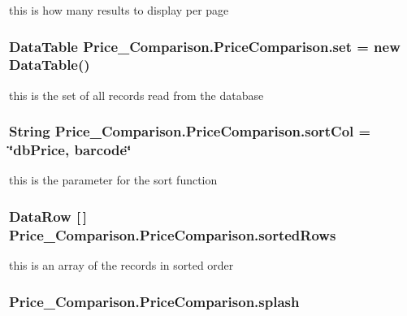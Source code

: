 this is how many results to display per page \hypertarget{class_price___comparison_1_1_price_comparison_a3d6993277a69f5816e84ceb7aa2a69c0}{
\subsubsection[{set}]{\setlength{\rightskip}{0pt plus 5cm}Data\-Table Price\-\_\-\-Comparison.\-Price\-Comparison.\-set = new Data\-Table()\hspace{0.3cm}{\ttfamily [static]}}}\label{class_price___comparison_1_1_price_comparison_a3d6993277a69f5816e84ceb7aa2a69c0}
this is the set of all records read from the database \hypertarget{class_price___comparison_1_1_price_comparison_a8b976f4f4e8b0a3d60f88ac7d799abec}{
\subsubsection[{sort\-Col}]{\setlength{\rightskip}{0pt plus 5cm}String Price\-\_\-\-Comparison.\-Price\-Comparison.\-sort\-Col = \char`\"{}db\-Price, barcode\char`\"{}\hspace{0.3cm}{\ttfamily [static]}}}\label{class_price___comparison_1_1_price_comparison_a8b976f4f4e8b0a3d60f88ac7d799abec}
this is the parameter for the sort function \hypertarget{class_price___comparison_1_1_price_comparison_adc440c55ac225fc7bcf5192a3966638f}{
\subsubsection[{sorted\-Rows}]{\setlength{\rightskip}{0pt plus 5cm}Data\-Row \mbox{[}$\,$\mbox{]} Price\-\_\-\-Comparison.\-Price\-Comparison.\-sorted\-Rows\hspace{0.3cm}{\ttfamily [static]}}}\label{class_price___comparison_1_1_price_comparison_adc440c55ac225fc7bcf5192a3966638f}
this is an array of the records in sorted order \hypertarget{class_price___comparison_1_1_price_comparison_a5c27abcda5ec2f037b329583a365e060}{
\subsubsection[{splash}]{ Price\-\_\-\-Comparison.\-Price\-Comparison.\-splash\hspace{0.3cm}{\ttfamily [static]}}}\label{class_price___comparison_1_1_price_comparison_a5c27abcda5ec2f037b329583a365e060}

